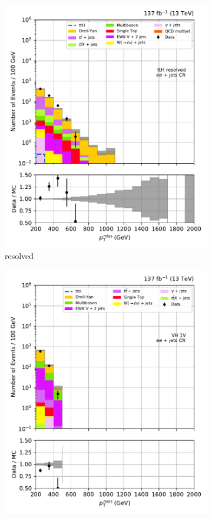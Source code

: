 \begin{figure}[htbp]
\begin{subfigure}[b]{0.24\textwidth}
        \includegraphics[width=\textwidth]{figures/region_plots/full_Run2/region_4/ttH_resolved.pdf}
        \caption{\ttH resolved}
    \end{subfigure}
    \hfill
    \begin{subfigure}[b]{0.24\textwidth}
        \includegraphics[width=\textwidth]{figures/region_plots/full_Run2/region_4/VH_1V.pdf}

\end{subfigure}
\end{figure}
